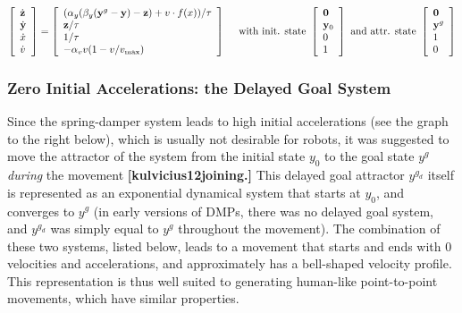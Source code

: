 \begin{eqnarray*} \left[ \begin{array}{l} {\dot{\mathbf{z}}} \\ {\dot{\mathbf{y}}} \\ {\dot{x}} \\ {\dot{v}} \end{array} \right] = \left[ \begin{array}{l} (\alpha_y (\beta_y({\mathbf{y}}^{g}-\mathbf{y})-\mathbf{z}) + v\cdot f(x))/\tau \\ \mathbf{z}/\tau \\ 1/\tau \\ -\alpha_v v (1-v/v_{\mbox{\scriptsize max}}) \end{array} \right] \mbox{~~~~with init. state~} \left[ \begin{array}{l} \mathbf{0} \\ \mathbf{y}_0 \\ 0 \\ 1 \end{array} \right] \mbox{~and attr. state~} \left[ \begin{array}{l} \mathbf{0} \\ \mathbf{y}^g \\ 1 \\ 0 \end{array} \right] \end{eqnarray*}\hypertarget{page_dmp_sec_delayed_goal}{}\subsubsection{Zero Initial Accelerations\+: the Delayed Goal System}\label{page_dmp_sec_delayed_goal}
Since the spring-\/damper system leads to high initial accelerations (see the graph to the right below), which is usually not desirable for robots, it was suggested to move the attractor of the system from the initial state $ y_0 $ to the goal state $ y^g $ {\itshape during} the movement {\bfseries [kulvicius12joining.]} This delayed goal attractor $ y^{g_d} $ itself is represented as an exponential dynamical system that starts at $ y_0 $, and converges to $ y^g $ (in early versions of D\+M\+Ps, there was no delayed goal system, and $ y^{g_d} $ was simply equal to $ y^g $ throughout the movement). The combination of these two systems, listed below, leads to a movement that starts and ends with 0 velocities and accelerations, and approximately has a bell-\/shaped velocity profile. This representation is thus well suited to generating human-\/like point-\/to-\/point movements, which have similar properties.

